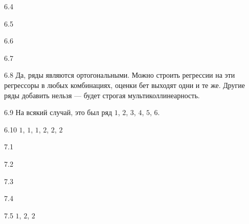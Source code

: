 \protect \hypertarget {soln:6.4}{}
\begin{solution}{{6.4}}
  
\end{solution}
\protect \hypertarget {soln:6.5}{}
\begin{solution}{{6.5}}
  
\end{solution}
\protect \hypertarget {soln:6.6}{}
\begin{solution}{{6.6}}
  
\end{solution}
\protect \hypertarget {soln:6.7}{}
\begin{solution}{{6.7}}
  
\end{solution}
\protect \hypertarget {soln:6.8}{}
\begin{solution}{{6.8}}
   Да, ряды являются ортогональными. Можно строить регрессии на эти регрессоры в любых комбинациях, оценки бет выходят одни и те же.
   Другие ряды добавить нельзя — будет строгая мультиколлинеарность.
 
\end{solution}
\protect \hypertarget {soln:6.9}{}
\begin{solution}{{6.9}}
     На всякий случай, это был ряд $1$, $2$, $3$, $4$, $5$, $6$.
   
\end{solution}
\protect \hypertarget {soln:6.10}{}
\begin{solution}{{6.10}}
   $1$, $1$, $1$, $2$, $2$, $2$
   
\end{solution}
\protect \hypertarget {soln:7.1}{}
\begin{solution}{{7.1}}
\end{solution}
\protect \hypertarget {soln:7.2}{}
\begin{solution}{{7.2}}

\end{solution}
\protect \hypertarget {soln:7.3}{}
\begin{solution}{{7.3}}

\end{solution}
\protect \hypertarget {soln:7.4}{}
\begin{solution}{{7.4}}

\end{solution}
\protect \hypertarget {soln:7.5}{}
\begin{solution}{{7.5}}
$1$, $2$, $2$
\end{solution}
\protect \hypertarget {soln:7.6}{}
